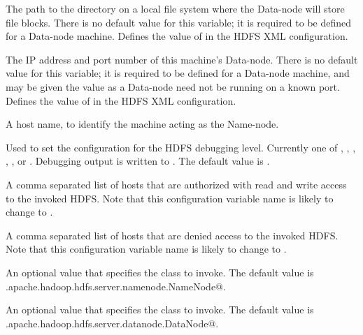 \begin{description}
\label{param:HDFSDatanodeDir}
\item[\Macro{HDFS\_DATANODE\_DIR}]
  The path to the directory on a local file system where the Data-node will
  store file blocks.
  There is no default value for this variable; it is required to be defined
  for a Data-node machine.
  Defines the value of  in the HDFS XML configuration.

\label{param:HDFSDatanodeAddress}
\item[\Macro{HDFS\_DATANODE\_ADDRESS}]
  The IP address and port number of this machine's Data-node.
  There is no default value for this variable; it is required to be defined
  for a Data-node machine, and may be given the value 
  as a Data-node need not be running on a known port.
  Defines the value of  in the HDFS XML
 configuration.

\label{param:HDFSServices}
\item[\Macro{HDFS\_SERVICES}]
  A host name, to identify the machine acting as the Name-node.

\label{param:HDFSLog4j}
\item[\Macro{HDFS\_LOG4J}]
  Used to set the configuration for the HDFS debugging level.
  Currently one of  , , , ,
  ,  or .
  Debugging output is written to .
  The default value is .

\label{param:HDFSAllow}
\item[\Macro{HDFS\_ALLOW}]
  A comma separated list of hosts that are authorized with read and write
  access to the invoked HDFS.
  Note that this configuration variable name is likely to change to
  .

\label{param:HDFSDeny}
\item[\Macro{HDFS\_DENY}]
  A comma separated list of hosts that are denied access to the invoked HDFS.
  Note that this configuration variable name is likely to change to
  .

\label{param:HDFSNamenodeClass}
\item[\Macro{HDFS\_NAMENODE\_CLASS}]
  An optional value that specifies the class to invoke.
  The default value is \verb@org.apache.hadoop.hdfs.server.namenode.NameNode@.

\label{param:HDFSDatanodeClass}
\item[\Macro{HDFS\_DATANODE\_CLASS}]
  An optional value that specifies the class to invoke.
  The default value is \verb@org.apache.hadoop.hdfs.server.datanode.DataNode@.


\end{description}
